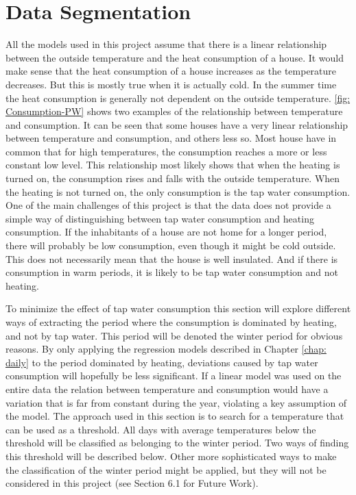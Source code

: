 \section{Data Segmentation}
All the models used in this project assume that there is a linear relationship between the outside temperature and the heat consumption of a house. It would make sense that the heat consumption of a house increases as the temperature decreases. But this is mostly true when it is actually cold. In the summer time the heat consumption is generally not dependent on the outside temperature. \cref{fig: Consumption-PW} shows two examples of the relationship between temperature and consumption. It can be seen that some houses have a very linear relationship between temperature and consumption, and others less so. Most house have in common that for high temperatures, the consumption reaches a more or less constant low level. This relationship most likely shows that when the heating is turned on, the consumption rises and falls with the outside temperature. When the heating is not turned on, the only consumption is the tap water consumption. One of the main challenges of this project is that the data does not provide a simple way of distinguishing between tap water consumption and heating consumption. If the inhabitants of a house are not home for a longer period, there will probably be low consumption, even though it might be cold outside. This does not necessarily mean that the house is well insulated. And if
there is consumption in warm periods, it is likely to be tap water consumption and not heating.

\noindent To minimize the effect of tap water consumption this section will explore different ways of extracting the period where the consumption is dominated by heating, and not by tap water. This period will be denoted the winter period for obvious reasons. By only applying the regression models described in Chapter \ref{chap: daily} to the period dominated by heating, deviations caused by tap water consumption will hopefully be less significant. If a linear model was used on the entire data the relation between temperature and consumption would have a variation that is far from constant during the year, violating a key assumption of the model. The approach used in this section is to search for a temperature that can be used as a threshold. All days with average temperatures below the threshold will be classified as belonging to the winter period. Two ways of finding this threshold will be described below. Other more sophisticated ways to make the classification of the winter period might be applied, but they will not be considered in this project (see Section 6.1 for Future Work).

